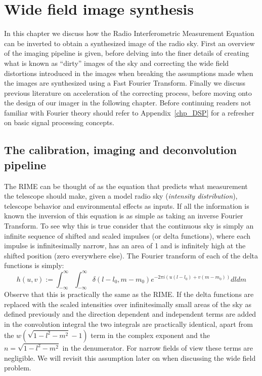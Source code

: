 \chapter{Wide field image synthesis}
\label{chapter_synthesis}
In this chapter we discuss how the Radio Interferometric Measurement Equation can be inverted to obtain a synthesized image of the radio sky. First an overview of the imaging pipeline is given, before
delving into the finer details of creating what is known as ``dirty'' images of the sky and correcting the wide field distortions introduced in the images when breaking the assumptions made when the images 
are synthesized using a Fast Fourier Transform. Finally we discuss previous literature on acceleration of the correcting process, before moving onto the design of our imager in the following chapter. Before
continuing readers not familiar with Fourier theory should refer to Appendix~\ref{chp_DSP} for a refresher on basic signal processing concepts.
\section{The calibration, imaging and deconvolution pipeline}
The RIME can be thought of as the equation that predicts what measurement the telescope should make, given a model radio sky (\emph{intensity distribution}), telescope behavior and environmental effects as inputs. 
If all the information is known the inversion of this equation is as simple as taking an inverse Fourier Transform. To see why this is true consider that the continuous sky is simply an infinite sequence of 
shifted and scaled impulses (or delta functions), where each impulse is infinitesimally narrow, has an area of 1 and is infinitely high at the shifted position (zero everywhere else). The Fourier transform 
of each of the delta functions is simply:
\begin{equation}
 \label{eqn_delta_response}
 h(u,v) := \int_{-\infty}^\infty\int_{-\infty}^\infty \delta(l-l_0,m-m_0)e^{-2\pi i(u(l-l_0)+v(m-m_0))}dldm
\end{equation}
Observe that this is practically the same as the RIME. If the delta functions are replaced with the scaled intensities over infinitesimally small areas of the sky as defined previously and the direction dependent and
independent terms are added in the convolution integral the two integrals are practically identical, apart from the $w(\sqrt{1-l^2-m^2}-1)$ term in the complex exponent and the $n = \sqrt{1-l^2-m^2}$ in the denumerator. 
For narrow fields of view these terms are negligible. We will revisit this assumption later on when discussing the wide field problem.

